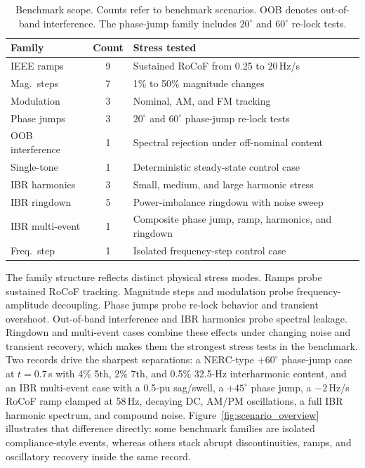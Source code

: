 \documentclass[conference,letterpaper]{IEEEtran}
\begin{document}
\begin{table}[t]
  \centering
  \caption{Benchmark scope. Counts refer to benchmark scenarios. OOB denotes
    out-of-band interference. The phase-jump family includes $20^\circ$ and
    $60^\circ$ re-lock tests.}
  \label{tab:benchmark_scope}
  \scriptsize
  \setlength{\tabcolsep}{3pt}
  \renewcommand{\arraystretch}{1.08}
  \begin{tabular}{L{1.7cm} c L{3.95cm}}
    \toprule
    Family & Count & Stress tested \\
    \midrule
    IEEE ramps & 9 & Sustained RoCoF from 0.25 to 20\,Hz/s \\
    Mag.\ steps & 7 & 1\% to 50\% magnitude changes \\
    Modulation & 3 & Nominal, AM, and FM tracking \\
    Phase jumps & 3 & $20^\circ$ and $60^\circ$ phase-jump re-lock tests \\
    OOB interference & 1 & Spectral rejection under off-nominal content \\
    Single-tone & 1 & Deterministic steady-state control case \\
    IBR harmonics & 3 & Small, medium, and large harmonic stress \\
    IBR ringdown & 5 & Power-imbalance ringdown with noise sweep \\
    IBR multi-event & 1 & Composite phase jump, ramp, harmonics, and ringdown \\
    Freq.\ step & 1 & Isolated frequency-step control case \\
    \bottomrule
  \end{tabular}
\end{table}

The family structure reflects distinct physical stress modes. Ramps probe
sustained RoCoF tracking. Magnitude steps and modulation probe
frequency-amplitude decoupling. Phase jumps probe re-lock behavior and
transient overshoot. Out-of-band interference and IBR harmonics probe spectral
leakage. Ringdown and multi-event cases combine these effects under changing
noise and transient recovery, which makes them the strongest stress tests in
the benchmark. Two records drive the sharpest separations: a NERC-type
$+60^\circ$ phase-jump case at $t=0.7$\,s with 4\% 5th, 2\% 7th, and 0.5\%
32.5-Hz interharmonic content, and an IBR multi-event case with a 0.5-pu
sag/swell, a $+45^\circ$ phase jump, a $-2$\,Hz/s RoCoF ramp clamped at
58\,Hz, decaying DC, AM/PM oscillations, a full IBR harmonic spectrum, and
compound noise. Figure~\ref{fig:scenario_overview} illustrates that
difference directly: some benchmark families are isolated compliance-style
events, whereas others stack abrupt discontinuities, ramps, and oscillatory
recovery inside the same record.
\end{document}
